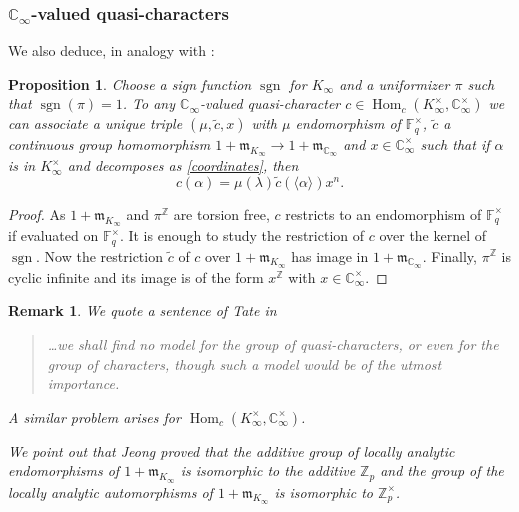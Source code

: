 \documentclass[11pt]{amsart}
\numberwithin{equation}{section}
\newcommand{\ZZ}{\mathbb{Z}}
\newcommand{\FF}{\mathbb{F}}
\newcommand{\CC}{\mathbb{C}}
\newcommand{\sgn}{\operatorname{sgn}}
\newtheorem{Proposition}[Theorem]{Proposition}
\newtheorem{Remark}[Theorem]{Remark}
\begin{document}
\subsubsection{$\CC_\infty$-valued quasi-characters}
We also deduce, in analogy with \cite[Theorem 2.3.1]{TAT}:
\begin{Proposition} Choose a sign function $\sgn$ for $K_\infty$ and a uniformizer $\pi$ such that $\sgn(\pi)=1$.
To any $\CC_\infty$-valued quasi-character $c\in \operatorname{Hom}_c(K_\infty^\times,\CC_\infty^\times)$ 
we can associate a unique triple $(\mu,\tilde{c},x)$ with $\mu$ endomorphism of $\FF_q^\times$, $\tilde{c}$ a continuous group homomorphism $1+\mathfrak{m}_{K_\infty}\rightarrow 1+\mathfrak{m}_{\CC_\infty}$ and $x\in\CC_\infty^\times$
such that if $\alpha$ is in $K_\infty^\times$ and decomposes as \eqref{coordinates}, then
$$c(\alpha)=\mu(\lambda)\tilde{c}(\langle\alpha\rangle)x^n.$$
\end{Proposition}

\begin{proof}
As $1+\mathfrak{m}_{K_\infty}$ and $\pi^\ZZ$ are torsion free, $c$ restricts to an endomorphism of $\FF_q^\times$ if evaluated on $\FF_q^\times$. 
It is enough to study the restriction of $c$ over the kernel of $\sgn$. Now the restriction $\tilde{c}$ of $c$ over $1+\mathfrak{m}_{K_\infty}$ has image in $1+\mathfrak{m}_{\CC_\infty}$. Finally, $\pi^\ZZ$ is cyclic infinite and 
its image is of the form $x^\ZZ$ with $x\in\CC_\infty^\times$.
\end{proof}

\begin{Remark}
{\em 
We quote a sentence of Tate in \cite[\S 2.3]{TAT} 

\begin{quote}
\ldots we shall find no model for the group of quasi-characters, or even for the group of characters, though such a model would be of the utmost importance.
\end{quote}

A similar problem arises for $\operatorname{Hom}_c(K_\infty^\times,\CC_\infty^\times)$.

\medskip


We point out that Jeong proved \cite{JEO} that 
the additive group of locally analytic endomorphisms of $1+\mathfrak{m}_{K_\infty}$ is isomorphic to the additive $\ZZ_p$ and 
the group of the locally analytic automorphisms of $1+\mathfrak{m}_{K_\infty}$ is isomorphic to $\ZZ_p^\times$.}
\end{Remark}
\end{document}
